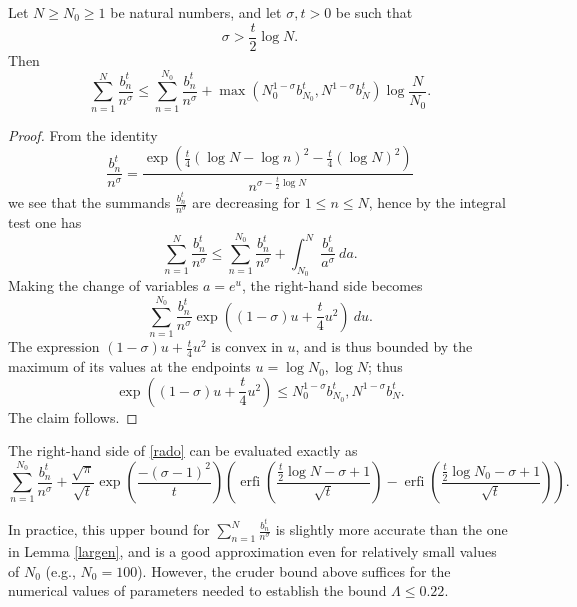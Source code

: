 \begin{lemma}\label{largen}
Let $N \geq N_0 \geq 1$ be natural numbers, and let $\sigma,t > 0$ be such that
$$ \sigma > \frac{t}{2} \log N.$$
Then
$$ \sum_{n=1}^N \frac{b_n^t}{n^\sigma} \leq \sum_{n=1}^{N_0}
\frac{b_n^t}{n^\sigma}  + 
\max( N_0^{1-\sigma} b_{N_0}^t, N^{1-\sigma} b_N^t ) \log \frac{N}{N_0}.$$
\end{lemma}

\begin{proof}  From the identity
$$ \frac{b_n^t}{n^\sigma} = \frac{\exp\left( \frac{t}{4} (\log N - \log n)^2 - \frac{t}{4} (\log N)^2\right) }{n^{\sigma - \frac{t}{2} \log N}}$$
we see that the summands $\frac{b_n^t}{n^\sigma}$ are decreasing for $1 \leq n \leq N$, hence by the integral test one has
\begin{equation}\label{rado}
 \sum_{n=1}^N \frac{b_n^t}{n^\sigma} \leq \sum_{n=1}^{N_0}
\frac{b_n^t}{n^\sigma}  + \int_{N_0}^N \frac{b_a^t}{a^\sigma}\ da.
\end{equation}
Making the change of variables $a = e^u$, the right-hand side becomes
$$\sum_{n=1}^{N_0} \frac{b_n^t}{n^\sigma} \exp( (1-\sigma) u + \frac{t}{4} u^2 )\ du.$$
The expression $(1-\sigma) u + \frac{t}{4} u^2$ is convex in $u$, and is thus bounded by the maximum of its values at the endpoints $u = \log N_0, \log N$; thus
$$\exp( (1-\sigma) u + \frac{t}{4} u^2) \leq N_0^{1-\sigma} b_{N_0}^t, N^{1-\sigma} b_N^t.$$
The claim follows. 
\end{proof}

\begin{remark}  The right-hand side of \eqref{rado} can be evaluated exactly as
$$
\sum_{n=1}^{N_0}
\frac{b_n^t}{n^\sigma}  + \frac{\sqrt \pi}{\sqrt t} \exp(\frac{-(\sigma - 1)^2}{t}) \left( \operatorname{erfi}\left(\frac{\frac{t}{2} \log N  - \sigma + 1}{\sqrt t} \right) - \operatorname{erfi}\left(\frac{\frac{t}{2} \log N_0  - \sigma + 1}{\sqrt t}\right) \right).$$

In practice, this upper bound for $\sum_{n=1}^N \frac{b_n^t}{n^\sigma}$ is slightly more accurate than the one in Lemma \ref{largen}, and is a good approximation even for relatively small values of $N_0$ (e.g., $N_0=100$).  However, the cruder bound above suffices for the numerical values of parameters needed to establish the bound $\Lambda \leq 0.22$.
\end{remark}

